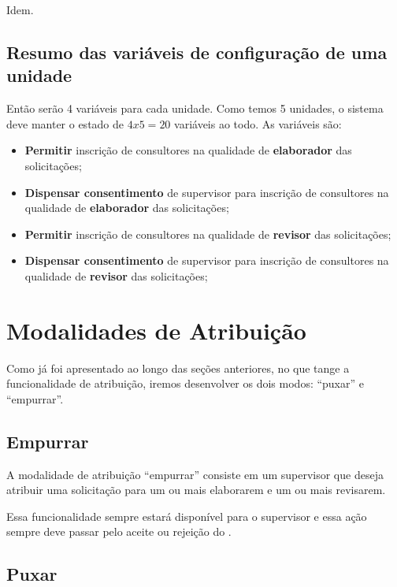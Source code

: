 Idem.

\subsection{Resumo das variáveis de configuração de uma unidade}

Então serão 4 variáveis para cada unidade. Como temos 5 unidades, o sistema deve manter o estado de $4x5 = 20$ variáveis ao todo. As variáveis são:

\begin{itemize}
	\item \msnao \textbf{Permitir} inscrição de consultores na qualidade de \textbf{elaborador} das solicitações;
	\item \msnao \textbf{Dispensar consentimento} de supervisor para inscrição de consultores na qualidade de \textbf{elaborador} das solicitações;
	\item \msnao \textbf{Permitir} inscrição de consultores na qualidade de \textbf{revisor} das solicitações;
	\item \msnao \textbf{Dispensar consentimento} de supervisor para inscrição de consultores na qualidade de \textbf{revisor} das solicitações;
\end{itemize}





\section{Modalidades de Atribuição}

Como já foi apresentado ao longo das seções anteriores, no que tange a funcionalidade de atribuição, iremos desenvolver os dois modos: ``puxar'' e ``empurrar''.

\subsection{Empurrar}

A modalidade de atribuição ``empurrar'' consiste em um supervisor que deseja atribuir uma solicitação para um ou mais \CLs elaborarem e um ou mais \CLs revisarem.

Essa funcionalidade sempre estará disponível para o supervisor e essa ação sempre deve passar pelo aceite ou rejeição do \CL. 

\subsection{Puxar}

